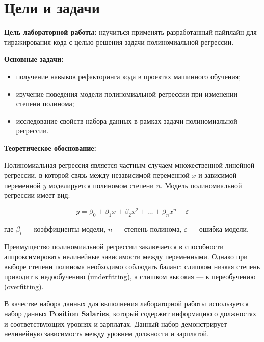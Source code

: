 \chapter*{Цели и задачи}
\label{ch:intro_lab8}

\textbf{Цель лабораторной работы:} научиться применять разработанный пайплайн для тиражирования кода с целью решения задачи полиномиальной регрессии.

\textbf{Основные задачи:}
\begin{itemize}
    \item получение навыков рефакторинга кода в проектах машинного обучения;
    \item изучение поведения модели полиномиальной регрессии при изменении степени полинома;
    \item исследование свойств набора данных в рамках задачи полиномиальной регрессии.
\end{itemize}

\textbf{Теоретическое обоснование:}

Полиномиальная регрессия является частным случаем множественной линейной регрессии, в которой связь между независимой переменной $x$ и зависимой переменной $y$ моделируется полиномом степени $n$. Модель полиномиальной регрессии имеет вид:

\begin{equation}
y = \beta_0 + \beta_1 x + \beta_2 x^2 + \ldots + \beta_n x^n + \varepsilon
\label{eq:polynomial}
\end{equation}

где $\beta_i$ — коэффициенты модели, $n$ — степень полинома, $\varepsilon$ — ошибка модели.

Преимущество полиномиальной регрессии заключается в способности аппроксимировать нелинейные зависимости между переменными. Однако при выборе степени полинома необходимо соблюдать баланс: слишком низкая степень приводит к недообучению (underfitting), а слишком высокая — к переобучению (overfitting).

В качестве набора данных для выполнения лабораторной работы используется набор данных \textbf{Position Salaries}, который содержит информацию о должностях и соответствующих уровнях и зарплатах. Данный набор демонстрирует нелинейную зависимость между уровнем должности и зарплатой.

\endinput